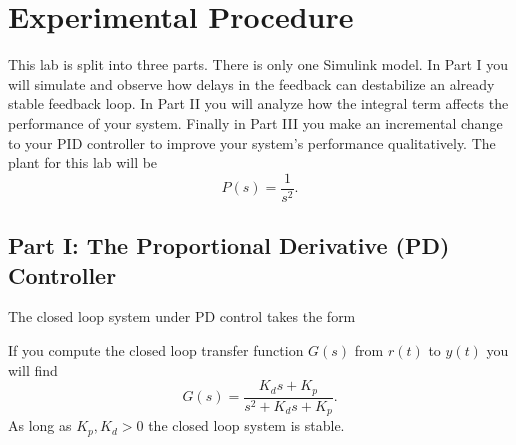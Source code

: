 \section{Experimental Procedure}\label{Lab:4:Experiment}
This lab is split into three parts.
There is only one Simulink model.
In Part I you will simulate and observe how delays in the feedback can destabilize an already stable feedback loop.
In Part II you will analyze how the integral term affects the performance of your system.
Finally in Part III you make an incremental change to your PID controller to improve your system's performance qualitatively.
The plant for this lab will be
\[
  P(s) = \frac{1}{s^2}.
\]

\subsection{Part I: The Proportional Derivative (PD) Controller}
The closed loop system under PD control takes the form
%
\begin{center}
\end{center}
If you compute the closed loop transfer function \(G(s)\) from \(r(t)\) to \(y(t)\) you will find
\[
  G(s) = \frac{K_d s + K_p}{s^2 + K_d s + K_p}.
\]
As long as \(K_p, K_d > 0\) the closed loop system is stable.
